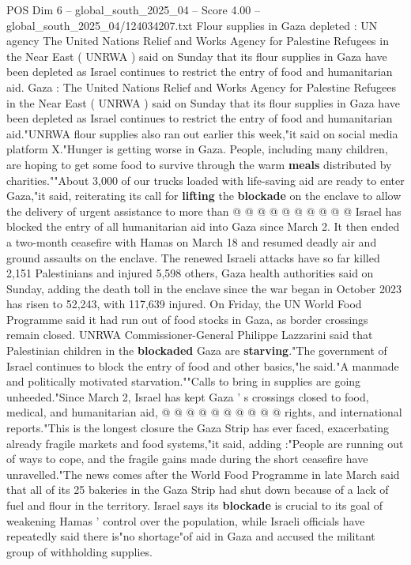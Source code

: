\begin{textsample}{POS Dim 6 – global\_south\_2025\_04 – Score 4.00 – global\_south\_2025\_04/124034207.txt}  \label{ex:f6_pos_283}
Flour supplies in Gaza depleted : UN agency The United Nations Relief and Works Agency for Palestine Refugees in the Near East ( UNRWA ) said on Sunday that its flour supplies in Gaza have been depleted as Israel continues to restrict the entry of food and humanitarian aid.
Gaza : The United Nations Relief and Works Agency for Palestine Refugees in the Near East ( UNRWA ) said on Sunday that its flour supplies in Gaza have been depleted as Israel continues to restrict the entry of food and humanitarian aid."UNRWA flour supplies also ran out earlier this week,"it said on social media platform X."Hunger is getting worse in Gaza.
People, including many children, are hoping to get some food to survive through the warm \textbf{meals} distributed by charities.""About 3,000 of our trucks loaded with life-saving aid are ready to enter Gaza,"it said, reiterating its call for \textbf{lifting} the \textbf{blockade} on the enclave to allow the delivery of urgent assistance to more than @ @ @ @ @ @ @ @ @ @ Israel has blocked the entry of all humanitarian aid into Gaza since March 2.
It then ended a two-month ceasefire with Hamas on March 18 and resumed deadly air and ground assaults on the enclave.
The renewed Israeli attacks have so far killed 2,151 Palestinians and injured 5,598 others, Gaza health authorities said on Sunday, adding the death toll in the enclave since the war began in October 2023 has risen to 52,243, with 117,639 injured.
On Friday, the UN World Food Programme said it had run out of food stocks in Gaza, as border crossings remain closed.
UNRWA Commissioner-General Philippe Lazzarini said that Palestinian children in the \textbf{blockaded} Gaza are \textbf{starving}."The government of Israel continues to block the entry of food and other basics,"he said."A manmade and politically motivated starvation.""Calls to bring in supplies are going unheeded."Since March 2, Israel has kept Gaza ' s crossings closed to food, medical, and humanitarian aid, @ @ @ @ @ @ @ @ @ @ rights, and international reports."This is the longest closure the Gaza Strip has ever faced, exacerbating already fragile markets and food systems,"it said, adding :"People are running out of ways to cope, and the fragile gains made during the short ceasefire have unravelled."The news comes after the World Food Programme in late March said that all of its 25 bakeries in the Gaza Strip had shut down because of a lack of fuel and flour in the territory.
Israel says its \textbf{blockade} is crucial to its goal of weakening Hamas ' control over the population, while Israeli officials have repeatedly said there is"no shortage"of aid in Gaza and accused the militant group of withholding supplies.

\end{textsample}
